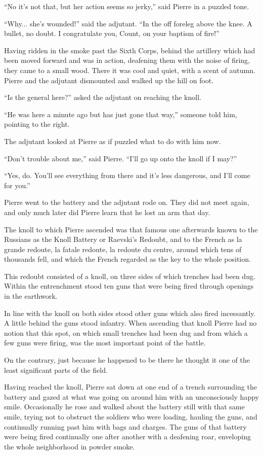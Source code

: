 ``No it's not that, but her action seems so jerky,'' said Pierre
in a puzzled tone.

``Why... she's wounded!'' said the adjutant. ``In the off foreleg
above the knee. A bullet, no doubt. I congratulate you, Count, on
your baptism of fire!''

Having ridden in the smoke past the Sixth Corps, behind the
artillery which had been moved forward and was in action,
deafening them with the noise of firing, they came to a small
wood. There it was cool and quiet, with a scent of autumn. Pierre
and the adjutant dismounted and walked up the hill on foot.

``Is the general here?'' asked the adjutant on reaching the
knoll.

``He was here a minute ago but has just gone that way,'' someone
told him, pointing to the right.

The adjutant looked at Pierre as if puzzled what to do with him
now.

``Don't trouble about me,'' said Pierre. ``I'll go up onto the
knoll if I may?''

``Yes, do. You'll see everything from there and it's less
dangerous, and I'll come for you.''

Pierre went to the battery and the adjutant rode on. They did not
meet again, and only much later did Pierre learn that he lost an
arm that day.

The knoll to which Pierre ascended was that famous one afterwards
known to the Russians as the Knoll Battery or Raevski's Redoubt,
and to the French as la grande redoute, la fatale redoute, la
redoute du centre, around which tens of thousands fell, and which
the French regarded as the key to the whole position.

This redoubt consisted of a knoll, on three sides of which
trenches had been dug. Within the entrenchment stood ten guns
that were being fired through openings in the earthwork.

In line with the knoll on both sides stood other guns which also
fired incessantly. A little behind the guns stood infantry. When
ascending that knoll Pierre had no notion that this spot, on
which small trenches had been dug and from which a few guns were
firing, was the most important point of the battle.

On the contrary, just because he happened to be there he thought
it one of the least significant parts of the field.

Having reached the knoll, Pierre sat down at one end of a trench
surrounding the battery and gazed at what was going on around him
with an unconsciously happy smile. Occasionally he rose and
walked about the battery still with that same smile, trying not
to obstruct the soldiers who were loading, hauling the guns, and
continually running past him with bags and charges. The guns of
that battery were being fired continually one after another with
a deafening roar, enveloping the whole neighborhood in powder
smoke.

